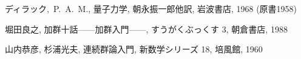 \documentclass[12pt,twoside]{jarticle}
\begin{document}
\begin{thebibliography}{ABC}






ディラック,~P.~A.~M., 量子力学, %
朝永振一郎他訳, 岩波書店, 1968 (原書1958)


堀田良之, 加群十話——加群入門——, すうがくぶっくす 3, 朝倉書店, 1988


山内恭彦, 杉浦光夫, 連続群論入門, 新数学シリーズ 18, 培風館, 1960



\end{thebibliography}

\end{document}
